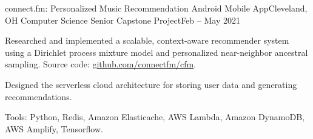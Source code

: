 \begin{ritemize}
{connect.fm: Personalized Music Recommendation Android Mobile App}{Cleveland, OH}
{Computer Science Senior Capstone Project}{Feb -- May 2021}
	\item Researched and implemented a scalable, context-aware recommender system using a Dirichlet process mixture model and personalized near-neighbor ancestral sampling. Source code: \url{github.com/connectfm/cfm}.
	\item Designed the serverless cloud architecture for storing user data and generating recommendations.
	\item Tools: Python, Redis, Amazon Elasticache, AWS Lambda, Amazon DynamoDB, AWS Amplify, Tensorflow.
\end{ritemize}